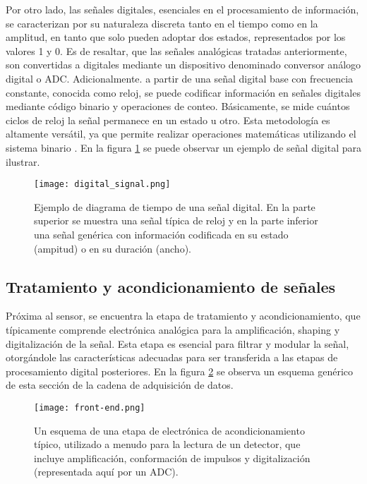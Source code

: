 \documentclass{report}
\begin{document}
\noindent Por otro lado, las señales digitales, esenciales en el procesamiento de información, se caracterizan por su naturaleza discreta tanto en el tiempo como en la amplitud, en tanto que solo pueden adoptar dos estados, representados por los valores 1 y 0. Es de resaltar, que las señales analógicas tratadas anteriormente, son convertidas a digitales mediante un dispositivo denominado conversor análogo digital o ADC. Adicionalmente. a partir de una señal digital base con frecuencia constante, conocida como reloj, se puede codificar información en señales digitales mediante código binario y operaciones de conteo. Básicamente, se mide cuántos ciclos de reloj la señal permanece en un estado u otro. Esta metodología es altamente versátil, ya que permite realizar operaciones matemáticas utilizando el sistema binario \cite{brown2000fundamentals}. En la figura \ref{fig:digital_siganl} se puede observar un ejemplo de señal digital para ilustrar.

\begin{figure}[H]
    \centering
    \texttt{[image: digital\_signal.png]}
    \caption{Ejemplo de diagrama de tiempo de una señal digital. En la parte superior se muestra una señal típica de reloj y en la parte inferior una señal genérica con información codificada en su estado (ampitud) o en su duración (ancho).}
    \label{fig:digital_siganl}

\end{figure}

\subsection{Tratamiento y acondicionamiento de señales}

\noindent Próxima al sensor, se encuentra la etapa de tratamiento y acondicionamiento, que típicamente comprende electrónica analógica para la amplificación, shaping y digitalización de la señal. Esta etapa es esencial para filtrar y modular la señal, otorgándole las características adecuadas para ser transferida a las etapas de procesamiento digital posteriores. En la figura \ref{fig:generic_frontend} se observa un esquema genérico de esta sección de la cadena de adquisición de datos.\\

\begin{figure}[h]
    \centering
    \texttt{[image: front-end.png]}
    \caption{Un esquema de una etapa de electrónica de acondicionamiento típico, utilizado a menudo para la lectura de un detector, que incluye amplificación, conformación de impulsos y digitalización (representada aquí por un ADC).}
    \label{fig:generic_frontend}

\end{figure}
\end{document}
